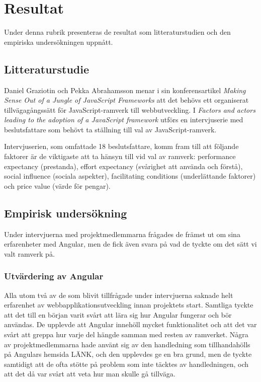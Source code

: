 \section{Resultat}

Under denna rubrik presenteras de resultat som litteraturstudien och den empiriska undersökningen uppnått.

\subsection{Litteraturstudie}

Daniel Graziotin och Pekka Abrahamsson menar i sin konferensartikel \textit{Making Sense Out of a Jungle of JavaScript Frameworks} \cite{making_sense} att det behövs ett organiserat tillvägagångssätt för JavaScript-ramverk till webbutveckling. I \textit{Factors and actors leading to the adoption of a JavaScript framework} \cite{js_framework} utförs en intervjuserie med beslutsfattare som behövt ta ställning till val av JavaScript-ramverk.

Intervjuserien, som omfattade 18 beslutsfattare, komm fram till att följande faktorer är de viktigaste att ta hänsyn till vid val av ramverk: performance expectancy (prestanda), effort expectancy (svårighet att använda och förstå), social influence (sociala aspekter), facilitating conditions (underlättande faktorer) och price value (värde för pengar).



\subsection{Empirisk undersökning}

Under intervjuerna med projektmedlemmarna frågades de främst ut om sina erfarenheter med Angular, men de fick även svara på vad de tyckte om det sätt vi valt ramverk på. 

\subsubsection{Utvärdering av Angular}

Alla utom två av de som blivit tillfrågade under intervjuerna saknade helt erfarenhet av webbapplikationsutveckling innan projektets start. Samtliga tyckte att det till en början varit svårt att lära sig hur Angular fungerar och bör användas. De upplevde att Angular innehöll mycket funktionalitet och att det var svårt att greppa hur varje del hängde samman med resten av ramverket. Några av projektmedlemmarna hade använt sig av den handledning som tillhandahölls på Angulars hemsida LÄNK, och den upplevdes ge en bra grund, men de tyckte samtidigt att de ofta stötte på problem som inte täcktes av handledningen, och att det då var svårt att veta hur man skulle gå tillväga.

